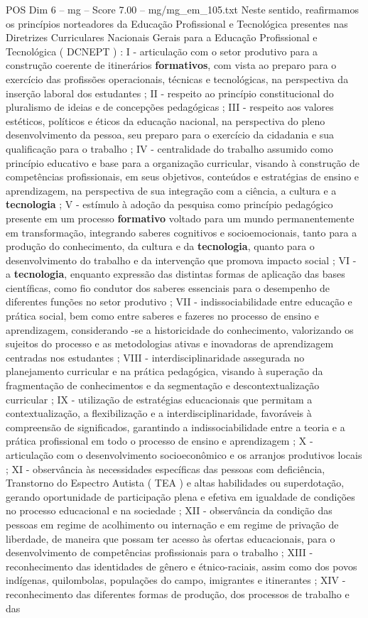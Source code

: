 \begin{textsample}{POS Dim 6 – mg – Score 7.00 – mg/mg\_em\_105.txt}
Neste sentido, reafirmamos os princípios norteadores da Educação Profissional e Tecnológica presentes nas Diretrizes Curriculares Nacionais Gerais para a Educação Profissional e Tecnológica ( DCNEPT ) : I - articulação com o setor produtivo para a construção coerente de itinerários \textbf{formativos}, com vista ao preparo para o exercício das profissões operacionais, técnicas e tecnológicas, na perspectiva da inserção laboral dos estudantes ; II - respeito ao princípio constitucional do pluralismo de ideias e de concepções pedagógicas ; III - respeito aos valores estéticos, políticos e éticos da educação nacional, na perspectiva do pleno desenvolvimento da pessoa, seu preparo para o exercício da cidadania e sua qualificação para o trabalho ; IV - centralidade do trabalho assumido como princípio educativo e base para a organização curricular, visando à construção de competências profissionais, em seus objetivos, conteúdos e estratégias de ensino e aprendizagem, na perspectiva de sua integração com a ciência, a cultura e a \textbf{tecnologia} ; V - estímulo à adoção da pesquisa como princípio pedagógico presente em um processo \textbf{formativo} voltado para um mundo permanentemente em transformação, integrando saberes cognitivos e socioemocionais, tanto para a produção do conhecimento, da cultura e da \textbf{tecnologia}, quanto para o desenvolvimento do trabalho e da intervenção que promova impacto social ; VI - a \textbf{tecnologia}, enquanto expressão das distintas formas de aplicação das bases científicas, como fio condutor dos saberes essenciais para o desempenho de diferentes funções no setor produtivo ; VII - indissociabilidade entre educação e prática social, bem como entre saberes e fazeres no processo de ensino e aprendizagem, considerando -se a historicidade do conhecimento, valorizando os sujeitos do processo e as metodologias ativas e inovadoras de aprendizagem centradas nos estudantes ; VIII - interdisciplinaridade assegurada no planejamento curricular e na prática pedagógica, visando à superação da fragmentação de conhecimentos e da segmentação e descontextualização curricular ; IX - utilização de estratégias educacionais que permitam a contextualização, a flexibilização e a interdisciplinaridade, favoráveis à compreensão de significados, garantindo a indissociabilidade entre a teoria e a prática profissional em todo o processo de ensino e aprendizagem ; X - articulação com o desenvolvimento socioeconômico e os arranjos produtivos locais ; XI - observância às necessidades específicas das pessoas com deficiência, Transtorno do Espectro Autista ( TEA ) e altas habilidades ou superdotação, gerando oportunidade de participação plena e efetiva em igualdade de condições no processo educacional e na sociedade ; XII - observância da condição das pessoas em regime de acolhimento ou internação e em regime de privação de liberdade, de maneira que possam ter acesso às ofertas educacionais, para o desenvolvimento de competências profissionais para o trabalho ; XIII - reconhecimento das identidades de gênero e étnico-raciais, assim como dos povos indígenas, quilombolas, populações do campo, imigrantes e itinerantes ; XIV - reconhecimento das diferentes formas de produção, dos processos de trabalho e das 
\end{textsample}
